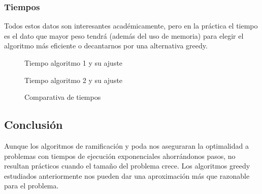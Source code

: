 \subsubsection{Tiempos}
Todos estos datos son interesantes académicamente, pero en la práctica el tiempo es el dato
que mayor peso tendrá (además del uso de memoria) para elegir el algoritmo más eficiente o 
decantarnos por una alternativa greedy.
\begin{figure}[H]
    \centering
    \caption{Tiempo algoritmo 1 y su ajuste}
\end{figure}


\begin{figure}[H]
    \centering
    \caption{Tiempo algoritmo 2 y su ajuste}
\end{figure}


\begin{figure}[H]
    \centering
    \caption{Comparativa de tiempos}
\end{figure}



\subsection{Conclusión}
Aunque los algoritmos de ramificación y poda nos aseguraran la optimalidad a problemas con
tiempos de ejecución exponenciales ahorrándonos pasos, no resultan prácticos cuando el tamaño
del problema crece. Los algoritmos greedy estudiados anteriormente nos pueden dar una aproximación
más que razonable para el problema.